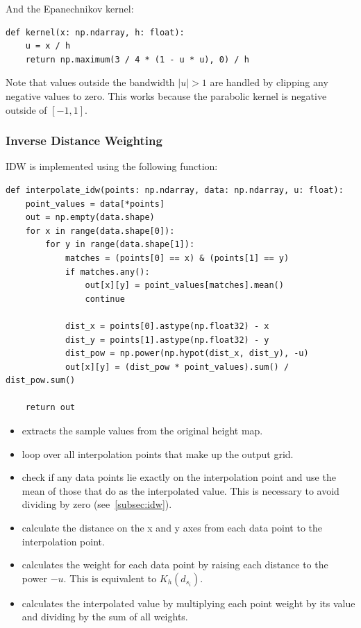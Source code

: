 \begin{minipage}{\textwidth}
And the Epanechnikov kernel:
\begin{lstlisting}[language={[AS]Python},caption=The parabolic kernel]
def kernel(x: np.ndarray, h: float):
    u = x / h
    return np.maximum(3 / 4 * (1 - u * u), 0) / h
\end{lstlisting}
Note that values outside the bandwidth $|u|>1$ are handled by clipping any negative values to zero. This works because the parabolic kernel is negative outside of $[-1, 1]$.
\end{minipage}

\subsubsection{Inverse Distance Weighting}

IDW is implemented using the following function:
\begin{lstlisting}[language={[AS]Python},caption=Interpolation with IDW]
def interpolate_idw(points: np.ndarray, data: np.ndarray, u: float):
    point_values = data[*points]
    out = np.empty(data.shape)
    for x in range(data.shape[0]):
        for y in range(data.shape[1]):
            matches = (points[0] == x) & (points[1] == y)
            if matches.any():
                out[x][y] = point_values[matches].mean()
                continue

            dist_x = points[0].astype(np.float32) - x
            dist_y = points[1].astype(np.float32) - y
            dist_pow = np.power(np.hypot(dist_x, dist_y), -u)
            out[x][y] = (dist_pow * point_values).sum() / dist_pow.sum()

    return out
\end{lstlisting}
\begin{itemize}
    \item {} extracts the sample values from the original height map.
    \item {} loop over all interpolation points that make up the output grid.
    \item {} check if any data points lie exactly on the interpolation point and use the mean of those that do as the interpolated value. This is necessary to avoid dividing by zero (see\ \autoref{subsec:idw}).
    \item {} calculate the distance on the x and y axes from each data point to the interpolation point.
    \item {} calculates the weight for each data point by raising each distance to the power $-u$. This is equivalent to $K_h\left(d_{s_i}\right)$.
    \item {} calculates the interpolated value by multiplying each point weight by its value and dividing by the sum of all weights.
\end{itemize}

